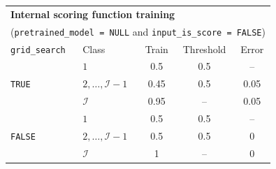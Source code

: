 \begin{itemize}
    





\begin{table}[ht]
\centering
\begin{tabular}{l|l|ccc}
\hline

\hline
\multicolumn{5}{l}{\textbf{Internal scoring function training}} \\
\multicolumn{5}{l}{(\texttt{pretrained\_model = NULL} and \texttt{input\_is\_score = FALSE})} \\
\hline
\texttt{grid\_search} & Class & Train & Threshold & Error \\
\hline
\multirow{3}{*}{\texttt{TRUE}} 
& \(1\) & 0.5 & 0.5 & -- \\
& \(2, \ldots, \mathcal{I}-1\) & 0.45 & 0.5 & 0.05 \\
& \(\mathcal{I}\) & 0.95 & -- & 0.05 \\
\hline
\multirow{3}{*}{\texttt{FALSE}} 
& \(1\) & 0.5 & 0.5 & -- \\
& \(2, \ldots, \mathcal{I}-1\) & 0.5 & 0.5 & 0 \\
& \(\mathcal{I}\) & 1 & -- & 0 \\
\hline


\end{tabular}
\end{table}
\end{itemize}
